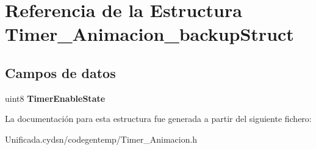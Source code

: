 \hypertarget{struct_timer___animacion__backup_struct}{}\section{Referencia de la Estructura Timer\+\_\+\+Animacion\+\_\+backup\+Struct}
\label{struct_timer___animacion__backup_struct}
\subsection*{Campos de datos}
\begin{DoxyCompactItemize}
\item 
\mbox{\label{struct_timer___animacion__backup_struct_a02d7a5264610dd17ede2bf5d1a8274cf}} 
uint8 {\bfseries Timer\+Enable\+State}
\end{DoxyCompactItemize}


La documentación para esta estructura fue generada a partir del siguiente fichero\+:\begin{DoxyCompactItemize}
\item 
Unificada.\+cydsn/codegentemp/Timer\+\_\+\+Animacion.\+h\end{DoxyCompactItemize}
